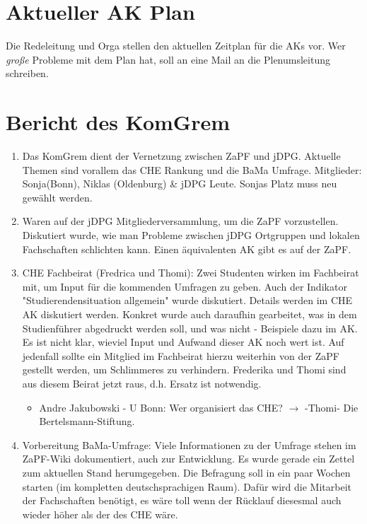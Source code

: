 \section{Aktueller AK Plan}
  Die Redeleitung und Orga stellen den aktuellen Zeitplan für die AKs vor. Wer \textit{große} Probleme mit dem Plan hat, soll an eine Mail an die Plenumsleitung schreiben.

\section{Bericht des KomGrem}
  \begin{enumerate}
    \item Das KomGrem dient der Vernetzung zwischen ZaPF und jDPG. Aktuelle Themen sind vorallem das CHE Rankung und die BaMa Umfrage. Mitglieder: Sonja(Bonn), Niklas (Oldenburg) \& jDPG Leute. Sonjas Platz muss neu gewählt werden.
    \item Waren auf der jDPG Mitgliederversammlung, um die ZaPF vorzustellen. Diskutiert wurde, wie man Probleme zwischen jDPG Ortgruppen und lokalen Fachschaften schlichten kann. Einen äquivalenten AK gibt es auf der ZaPF.
    \item CHE Fachbeirat (Fredrica und Thomi): Zwei Studenten wirken im Fachbeirat mit, um Input für die kommenden Umfragen zu geben. Auch der Indikator "Studierendensituation allgemein" wurde diskutiert. Details werden im CHE AK diskutiert werden.
      Konkret wurde auch daraufhin gearbeitet, was in dem Studienführer abgedruckt werden soll, und was nicht - Beispiele dazu im AK. Es ist nicht klar, wieviel Input und Aufwand dieser AK noch wert ist.
      Auf jedenfall sollte ein Mitglied im Fachbeirat hierzu weiterhin von der ZaPF gestellt werden, um Schlimmeres zu verhindern.
      Frederika und Thomi sind aus diesem Beirat jetzt raus, d.h. Ersatz ist notwendig.
      \begin{itemize}
        \item Andre Jakubowski - U Bonn:  Wer organisiert das CHE? $\rightarrow$ -Thomi- Die Bertelsmann-Stiftung.
      \end{itemize}
    \item Vorbereitung BaMa-Umfrage: Viele Informationen zu der Umfrage stehen im ZaPF-Wiki dokumentiert, auch zur Entwicklung. Es wurde gerade ein Zettel zum aktuellen Stand herumgegeben. Die Befragung soll in ein paar Wochen starten (im kompletten deutschsprachigen Raum).
      Dafür wird die Mitarbeit der Fachschaften benötigt, es wäre toll wenn der Rücklauf diesesmal auch wieder höher als der des CHE wäre.

\end{enumerate}
